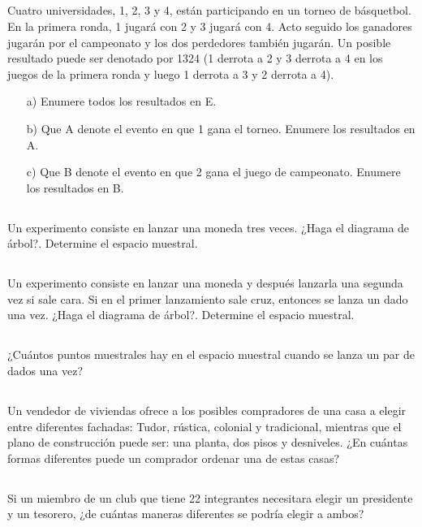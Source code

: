 \documentclass[11pt,letterpaper]{report}
\begin{document}
      \subsection{}
        Cuatro universidades, 1, 2, 3 y 4, están participando en un torneo de básquetbol. En la primera ronda, 1 jugará con 2 y 3 jugará con 4. Acto seguido los ganadores jugarán por el campeonato y los dos perdedores también jugarán. Un posible resultado puede ser denotado por 1324 (1 derrota a 2 y 3 derrota a 4 en los juegos de la primera ronda y luego 1 derrota a 3 y 2 derrota a 4).
        \begin{itemize}
          \item [a)] Enumere todos los resultados en E.
          \item [b)] Que A denote el evento en que 1 gana el torneo. Enumere los resultados en A.
          \item [c)] Que B denote el evento en que 2 gana el juego de campeonato. Enumere los resultados en B.
        \end{itemize}
      \subsection{}
        Un experimento consiste en lanzar una moneda tres veces. ¿Haga el diagrama de árbol?. Determine el espacio muestral.
      \subsection{}
        Un experimento consiste en lanzar una moneda y después lanzarla una segunda vez si sale cara. Si en el primer lanzamiento sale cruz, entonces se lanza un dado una vez. ¿Haga el diagrama de árbol?. Determine el espacio muestral.
      \subsection{}
        ¿Cuántos puntos muestrales hay en el espacio muestral cuando se lanza un par de dados una vez?
      \subsection{}
        Un vendedor de viviendas ofrece a los posibles compradores de una casa a elegir entre diferentes fachadas:  Tudor, rústica, colonial y tradicional, mientras que el plano de construcción puede ser:  una planta, dos pisos y desniveles. ¿En cuántas formas diferentes puede un comprador ordenar una de estas casas?
      \subsection{}
        Si un miembro de un club que tiene 22 integrantes necesitara elegir un presidente y un tesorero, ¿de cuántas maneras diferentes se podría elegir a ambos?
\end{document}

